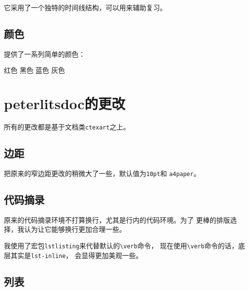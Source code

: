 \documentclass{peterlitsdoc}
\newcommand{\vb}{\verb}
\begin{document}

它采用了一个独特的时间线结构，可以用来辅助复习。


\subsection{颜色}

提供了一系列简单的颜色：

\begin{pltrun}
\pltred   红色\pltrule
\pltblack 黑色\pltrule
\pltblue  蓝色\pltrule
\pltgray  灰色\pltrule
\end{pltrun}


\section{peterlitsdoc的更改}

所有的更改都是基于文档类\vb|ctexart|之上。


\subsection{边距}

把原来的窄边距更改的稍微大了一些，默认值为\vb|10pt|和
\vb|a4paper|。


\subsection{代码摘录}

原来的代码摘录环境不打算换行，尤其是行内的代码环境。为了
更棒的排版选择，我认为让它能够换行更加合理一些。

我使用了宏包\vb|lstlisting|来代替默认的\verb|\verb|命令，
现在使用\verb|\verb|命令的话，底层其实是\vb|lst-inline|，
会显得更加美观一些。


\subsection{列表}
\end{document}
